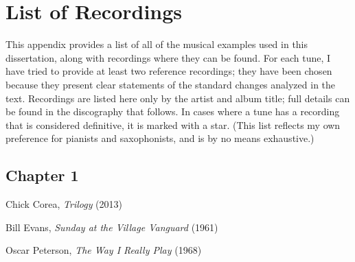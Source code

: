 \chapter{List of Recordings}

\singlespacing

%
%
This appendix provides a list of all of the musical examples used in this
dissertation, along with recordings where they can be found. For each tune, I
have tried to provide at least two reference recordings; they have been
chosen because they present clear statements of the standard changes analyzed
in the text. Recordings are listed here only by the artist and album title;
full details can be found in the discography that follows. In cases where a
tune has a recording that is considered definitive, it is marked with a star.
(This list reflects my own preference for pianists and saxophonists, and is by
no means exhaustive.)

\section*{Chapter 1}

\vspace{-1em}

\begin{compactitem}
    \item Chick Corea, \emph{Trilogy} (2013)
    \item Bill Evans, \emph{Sunday at the Village Vanguard} (1961)
    \item Oscar Peterson, \emph{The Way I Really Play} (1968)
\end{compactitem}
\nocite{corea:trilogy,evans:sunday,peterson:reallyplay}


